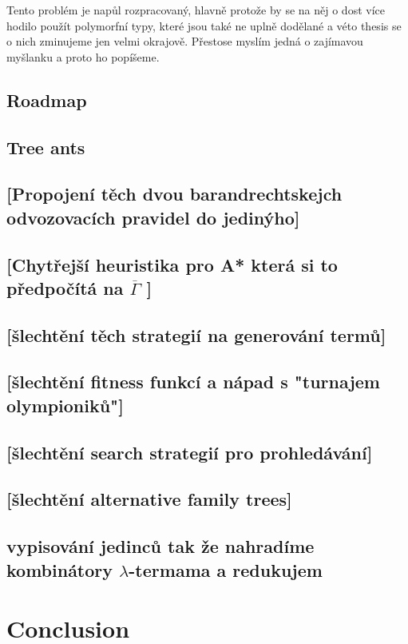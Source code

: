 \documentclass[12pt,a4paper]{report}
\newcommand{\lterm}{$\lambda$-term\xspace}
\begin{document}
Tento problém je napůl rozpracovaný, hlavně protože by se na něj o dost více
hodilo použít polymorfní typy, které jsou také ne uplně dodělané a véto thesis
se o nich zminujeme jen velmi okrajově. Přestose myslím jedná o zajímavou myšlanku
a proto ho popíšeme.

\section{Roadmap}
\section{Tree ants}
\section{[Propojení těch dvou barandrechtskejch odvozovacích pravidel do jedinýho]}
\section{[Chytřejší heuristika pro A* která si to předpočítá na $\overline{\Gamma}$ ]}
\section{[šlechtění těch strategií na generování termů]}
\section{[šlechtění fitness funkcí a nápad s "turnajem olympioniků"]}
\section{[šlechtění search strategií pro prohledávání]}
\section{[šlechtění alternative family trees]}

\section{vypisování jedinců tak že nahradíme kombinátory \lterm{}ama a redukujem }



\chapter*{Conclusion}
\end{document}
